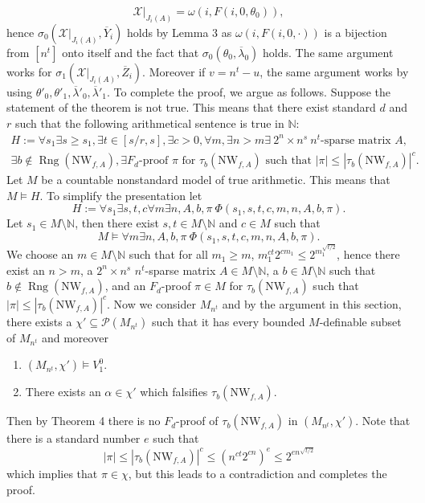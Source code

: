 \[\mathcal X|_{J_i(A)}=\omega(i,F(i,0,\theta_0)),\]
hence $\sigma_0(\mathcal X|_{J_i(A)},\overline Y_i)$ holds by Lemma 3 as $\omega(i,F(i,0,\cdot))$ is a bijection from $[n^t]$ onto itself and the fact that $\sigma_0(\theta_0,\overline\lambda_0)$ holds. The same argument works for $\sigma_1(\mathcal X|_{J_i(A)},\overline Z_i)$. Moreover if $v=n^t-u$, the same argument works by using $\theta'_0,\theta'_1,\overline\lambda'_0,\overline\lambda'_1$.
To complete the proof, we argue as follows. Suppose the statement of the theorem is not true. This means that there exist standard $d$ and $r$ such that the following arithmetical sentence is true in $\mathbb N$:
\begin{multline*}
H:=\forall s_1\exists s\geq s_1,\exists t\in[s/r,s],\exists c>0,\forall m,\exists n>m\exists\ 2^n\times n^s\ n^t\text{-sparse matrix }A,\\
\exists b\notin\operatorname{Rng}(\mathrm{NW}_{f,A}),\exists F_d\text{-proof }\pi\text{ for }\tau_b(\mathrm{NW}_{f,A})\text{ such that }|\pi|\leq|\tau_b(\mathrm{NW}_{f,A})|^c.
\end{multline*}
Let $M$ be a countable nonstandard model of true arithmetic. This means that $M\models H$. To simplify the presentation let
\[H:=\forall s_1\exists s,t,c\forall m\exists n,A,b,\pi\ \Phi(s_1,s,t,c,m,n,A,b,\pi).\]
Let $s_1\in M\setminus\mathbb N$, then there exist $s,t\in M\setminus\mathbb N$ and $c\in M$ such that
\[M\models\forall m\exists n,A,b,\pi\ \Phi(s_1,s,t,c,m,n,A,b,\pi).\]
We choose an $m\in M\setminus\mathbb N$ such that for all $m_1\geq m$, $m_1^{ct}2^{cm_1}\leq2^{m_1^{\sqrt{t/2}}}$, hence there exist an $n>m$, a $2^n\times n^s$ $n^t$-sparse matrix $A\in M\setminus\mathbb N$, a $b\in M\setminus\mathbb N$ such that $b\notin\operatorname{Rng}(\mathrm{NW}_{f,A})$, and an $F_d$-proof $\pi\in M$ for $\tau_b(\mathrm{NW}_{f,A})$ such that $|\pi|\leq|\tau_b(\mathrm{NW}_{f,A})|^c$. Now we consider $M_{n^t}$ and by the argument in this section, there exists a $\chi'\subseteq\mathcal P(M_{n^t})$ such that it has every bounded $M$-definable subset of $M_{n^t}$ and moreover
\begin{enumerate}
\item $(M_{n^t},\chi')\models V_1^0$.
\item There exists an $\alpha\in\chi'$ which falsifies $\tau_b(\mathrm{NW}_{f,A})$.
\end{enumerate}
Then by Theorem 4 there is no $F_d$-proof of $\tau_b(\mathrm{NW}_{f,A})$ in $(M_{n^t},\chi')$. Note that there is a standard number $e$ such that
\[|\pi|\leq|\tau_b(\mathrm{NW}_{f,A})|^c\leq(n^{ct}2^{cn})^e\leq2^{en^{\sqrt{t/2}}}\]
which implies that $\pi\in\chi$, but this leads to a contradiction and completes the proof.
